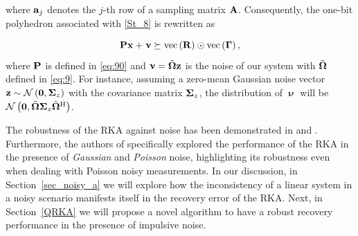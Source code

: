 \documentclass[12pt,draftcls,onecolumn]{IEEEtran}
\begin{document}
where $\mathbf{a}_{j}$ denotes the $j$-th row of a sampling matrix $\mathbf{A}$.
Consequently, the one-bit polyhedron associated with \eqref{St_8} is rewritten as

\begin{equation}
\label{St_10}   
\mbP \mbx+\boldsymbol{\upnu}\succeq \operatorname{vec}\left(\mathbf{R}\right)\odot \operatorname{vec}\left(\bGamma\right),
\end{equation}\normalsize
where $\mathbf{P}$ is defined in \eqref{eq:90} and $\boldsymbol{\upnu}=\Tilde{\boldsymbol{\Omega}}\mathbf{z}$ is the noise of our system with $\Tilde{\boldsymbol{\Omega}}$ defined in \eqref{eq:9}. For instance, %
assuming a zero-mean Gaussian noise vector 
$\mathbf{z}\sim\mathcal{N}\left(\mathbf{0},\boldsymbol{\Sigma}_z\right)$ with 
the covariance matrix $\boldsymbol{\Sigma}_z$, the distribution of $\boldsymbol{\upnu}$ will be $\mathcal{N}\left(\mathbf{0}, \Tilde{\boldsymbol{\Omega}}\boldsymbol{\Sigma}_z\Tilde{\boldsymbol{\Omega}}^{\mathrm{H}}\right)$.

The robustness of the RKA
against noise has been demonstrated in \cite{needell2010randomized} and \cite{romer2021randomized}. Furthermore, the authors of \cite{huang2022linear} specifically explored the performance of the RKA %
in the presence of \emph{Gaussian} and \emph{Poisson} noise, highlighting its robustness even when dealing with Poisson noisy measurements. In our discussion, in Section~\ref{sec_noisy_a} we will explore how the inconsistency of a linear system in a noisy scenario manifests itself in the recovery error of the RKA. Next, in Section~\ref{QRKA} we will propose a novel algorithm to have a robust recovery performance in the presence of impulsive noise.
\end{document}
